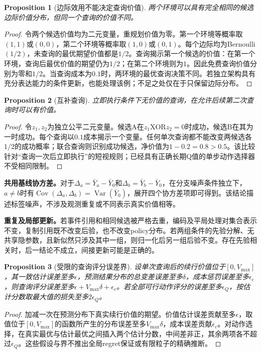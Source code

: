 \documentclass[sigconf,anonymous,review]{acmart}
\DeclareMathOperator{\Cov}{Cov}
\DeclareMathOperator{\Var}{Var}
\theoremstyle{zhplain}
\newtheorem{proposition}{命题}
\newtheorem{proposition}{Proposition}
\begin{document}
\begin{proposition}[边际效用不能决定查询价值]
两个环境可以具有完全相同的候选边际价值分布，但同一个查询的价值不同。
\end{proposition}
\begin{proof}
令两个候选价值均为二元变量，重规划价值为零。第一个环境等概率取\((1,1)\)或\((0,0)\)，第二个环境等概率取\((1,0)\)或\((0,1)\)。每个边际均为Bernoulli\((1/2)\)，未查询的最优期望价值都是\(1/2\)。查询揭示第一个候选的价值：在第一个环境，查询后最优价值的期望仍为\(1/2\)；在第二个环境则为\(1\)。因此免费查询价值分别为零和\(1/2\)。当查询成本为\(0.1\)时，两环境的最优查询决策不同。若独立架构具有充分表达能力的条件更新，也能处理该例；不足之处仅在于只保留边际分布。
\end{proof}

\begin{proposition}[互补查询]
立即执行条件下无价值的查询，在允许后续第二次查询时可以有价值。
\end{proposition}
\begin{proof}
令\(z_1,z_2\)为独立公平二元变量。候选A在\(z_1\mathbin{\mathrm{XOR}}z_2=0\)时成功，候选B在其为一时成功。每个查询以\(0.1\)成本揭示一个变量。任何单次查询都不能改变两候选各\(1/2\)的成功概率；联合查询则识别成功候选，净价值为\(1-0.2=0.8>0.5\)。该比较针对``查询一次后立即执行''的短视规则；已经具有正确长期Q值的单步动作选择器不受相同限制。
\end{proof}

\textbf{共用基线协方差。}对于\(\Delta_a=\bar Y_a-\bar Y_0\)和\(\Delta_b=\bar Y_b-\bar Y_0\)，在分支噪声条件独立下，\(a\ne b\)时有\(\Cov(\Delta_a,\Delta_b)=\Var(\bar Y_0)\)，展开四个协方差项即可得到。该结论描述标签噪声，不涉及观测重复或不同表示真实价值相等。

\textbf{重复及局部更新。}若事件引用和相同候选被严格去重，编码及平局处理对集合表示不变，复制引用既不改变后验，也不改变policy分布。若两组条件的先验分解、无共享隐参数，且新似然只涉及其中一组，则归一化后另一组后验不变。存在先验相关时，后一结论不成立，间接更新可能是正确的。

\begin{proposition}[受限的查询评分误差界]
设单次查询后的续行价值位于\([0,V_{\max}]\)，其一致估计误差至多\(\epsilon\)，预测结果分布的总变差误差至多\(\delta\)，成本惩罚误差至多\(\epsilon_c\)，则查询评分误差至多\(\epsilon+V_{\max}\delta+\epsilon_c\)。若全部可行动作评分的误差至多\(\epsilon_Q\)，按估计分数取最大值的损失至多\(2\epsilon_Q\)。
\end{proposition}
\begin{proof}
加减一次在预测分布下真实续行价值的期望。价值估计误差贡献至多\(\epsilon\)，取值位于\([0,V_{\max}]\)的函数所产生的分布误差至多\(V_{\max}\delta\)，成本误差贡献\(\epsilon_c\)。对动作选择，在真实最优与估计最优之间插入两个估计分数，中间差非正，其余两项各不超过\(\epsilon_Q\)。这些假设与界不推出全局regret保证或有限粒子的精确推断。
\end{proof}
\end{document}
